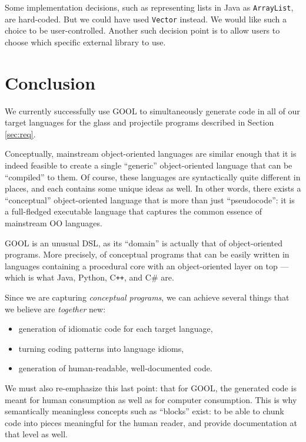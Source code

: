 \documentclass[sigplan,screen,10pt]{acmart}
\newcommand{\Csharp}{C\#}
\newcommand{\Cplusplus}{C\texttt{++}}
\begin{document}
Some implementation decisions, such as representing lists in Java as 
\verb|ArrayList|, are hard-coded. But we could have used \verb|Vector| instead.
We would like such a choice to be user-controlled. Another such decision
point is to allow users to choose which specific external library to use.

\section{Conclusion} \label{sec:conclusions}

We currently successfully use GOOL to simultaneously generate code in all of 
our target languages for the glass and projectile programs described in Section 
\ref{sec:req}. 

Conceptually, mainstream object-oriented languages are similar enough that it
is indeed feasible to create a single ``generic'' object-oriented language that
can be ``compiled'' to them.  Of course, these languages are syntactically
quite different in places, and each contains some unique ideas as well.
In other words, there exists a ``conceptual'' object-oriented language that
is more than just ``pseudocode'': it is a full-fledged executable language
that captures the common essence of mainstream OO
languages.

GOOL is an unusual DSL, as its ``domain'' is actually that of object-oriented
programs. More precisely, of conceptual programs that can be
easily written in languages containing a procedural core with an
object-oriented layer on top --- which is what Java, Python, \Cplusplus{}, and
\Csharp{} are.

Since we are capturing \emph{conceptual programs}, we can achieve
several things that we believe are \emph{together} new:
\begin{itemize}
\item generation of idiomatic code for each target language,
\item turning coding patterns into language idioms,
\item generation of human-readable, well-documented code.
\end{itemize}

We must also re-emphasize this last point: that for GOOL, the generated code
is meant for human consumption as well as for computer consumption. This is
why semantically meaningless concepts such as ``blocks'' exist: to be able
to chunk code into pieces meaningful for the human reader, and provide
documentation at that level as well.
\end{document}
